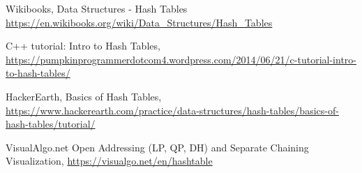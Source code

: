 \begin{thebibliography}{9}
Wikibooks, Data Structures - Hash Tables \href{https://en.wikibooks.org/wiki/Data_Structures/Hash_Tables}{https://en.wikibooks.org/wiki/Data\_Structures/Hash\_Tables}

C++ tutorial: Intro to Hash Tables,
\href{https://pumpkinprogrammerdotcom4.wordpress.com/2014/06/21/c-tutorial-intro-to-hash-tables/}{https://pumpkinprogrammerdotcom4.wordpress.com/2014/06/21/c-tutorial-intro-to-hash-tables/}

HackerEarth, Basics of Hash Tables, \href{https://www.hackerearth.com/practice/data-structures/hash-tables/basics-of-hash-tables/tutorial/}{https://www.hackerearth.com/practice/data-structures/hash-tables/basics-of-hash-tables/tutorial/}

VisualAlgo.net Open Addressing (LP, QP, DH) and Separate Chaining Visualization, \href{https://visualgo.net/en/hashtable}{https://visualgo.net/en/hashtable}

\end{thebibliography}

